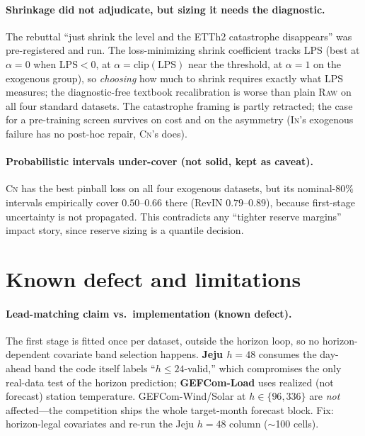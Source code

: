 \documentclass{article}
\newcommand{\lps}{\ensuremath{\mathrm{LPS}}}
\newcommand{\rawm}{\textsc{Raw}}
\newcommand{\inm}{\textsc{In}}
\newcommand{\cnm}{\textsc{Cn}}
\newcommand{\bad}{\textcolor{red!75!black}{\textbf{not solid}}}
\newcommand{\defect}{\textcolor{orange!85!black}{\textbf{known defect}}}
\begin{document}
\paragraph{Shrinkage did not adjudicate, but sizing it needs the diagnostic.}
The rebuttal ``just shrink the level and the ETTh2 catastrophe disappears'' was
pre-registered and run. The loss-minimizing shrink coefficient tracks \lps{}
(best at $\alpha{=}0$ when $\lps{<}0$, at $\alpha{=}\mathrm{clip}(\lps)$ near the
threshold, at $\alpha{=}1$ on the exogenous group), so \emph{choosing} how much
to shrink requires exactly what \lps{} measures; the diagnostic-free textbook
recalibration is worse than plain \rawm{} on all four standard datasets. The
catastrophe framing is partly retracted; the case for a pre-training screen
survives on cost and on the asymmetry (\inm's exogenous failure has no post-hoc
repair, \cnm's does).

\paragraph{Probabilistic intervals under-cover (\bad, kept as caveat).}
\cnm{} has the best pinball loss on all four exogenous datasets, but its
nominal-$80\%$ intervals empirically cover $0.50$--$0.66$ there (RevIN
$0.79$--$0.89$), because first-stage uncertainty is not propagated. This
contradicts any ``tighter reserve margins'' impact story, since reserve sizing
is a quantile decision.

\section{Known defect and limitations}

\paragraph{Lead-matching claim vs.\ implementation (\defect).}
The first stage is fitted once per dataset, outside the horizon loop, so no
horizon-dependent covariate band selection happens. \textbf{Jeju $h{=}48$}
consumes the day-ahead band the code itself labels ``$h\!\le\!24$-valid,'' which
compromises the only real-data test of the horizon prediction; \textbf{GEFCom-Load}
uses realized (not forecast) station temperature. GEFCom-Wind/Solar at
$h{\in}\{96,336\}$ are \emph{not} affected---the competition ships the whole
target-month forecast block. Fix: horizon-legal covariates and re-run the Jeju
$h{=}48$ column ($\sim$100 cells).
\end{document}
